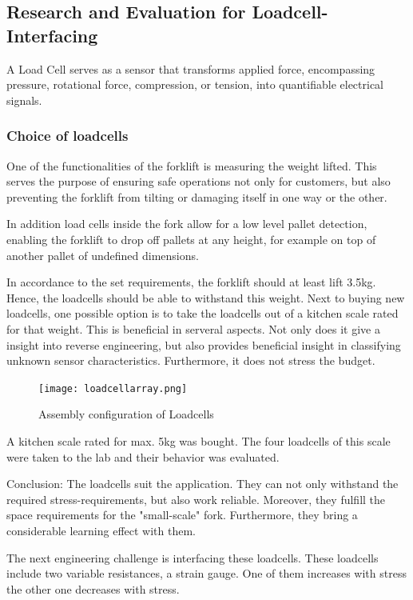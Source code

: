 \documentclass[../report.tex]{subfiles}
\begin{document}
\subsection{Research and Evaluation for Loadcell-Interfacing}
A Load Cell serves as a sensor that transforms applied force, encompassing pressure, rotational force, compression,
or tension, into quantifiable electrical signals.

\subsubsection{Choice of loadcells}

One of the functionalities of the forklift is measuring the weight lifted.
This serves the purpose of ensuring safe operations not only for customers, 
but also preventing the forklift from tilting or damaging itself in one way or the other.

In addition load cells inside the fork allow for a low level pallet detection, enabling 
the forklift to drop off pallets at any height, for example on top of another pallet of undefined 
dimensions. 

In accordance to the set requirements, the forklift should at least lift 3.5kg.
Hence, the loadcells should be able to withstand this weight. 
Next to buying new loadcells, one possible option is to take the loadcells
out of a kitchen scale rated for that weight. This is beneficial in serveral aspects.
Not only does it give a insight into reverse engineering, but also provides beneficial
insight in classifying unknown sensor characteristics. Furthermore, it does not 
stress the budget. 

\begin{figure}[H]
  \centering
  \texttt{[image: loadcellarray.png]}
  \caption{Assembly configuration of Loadcells}
\end{figure}

A kitchen scale rated for max. 5kg was bought. The four loadcells of this scale were taken to the lab and
their behavior was evaluated. 

Conclusion: The loadcells suit the application. They can not only withstand the
required stress-requirements, but also work reliable. Moreover, they fulfill the 
space requirements for the "small-scale" fork. Furthermore, they bring a considerable
learning effect with them.

The next engineering challenge is interfacing these loadcells.
These loadcells include two variable resistances, a strain gauge. One of them increases
with stress the other one decreases with stress. 
\end{document}
